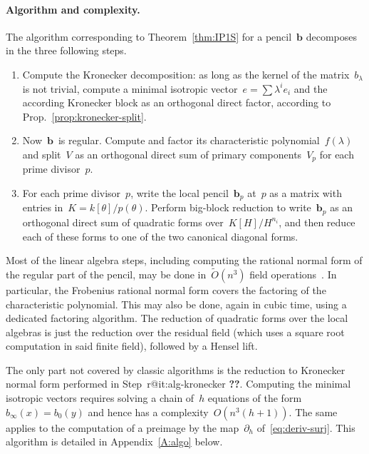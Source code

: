 \documentclass{article}%
\makeatletter
\newif\ifapx \apxtrue %
\def\labelenumi{(\roman{enumi})}
\def\itemref#1{\expandafter\ifx\csname r@#1\endcsname\relax
  {\bfseries ??}\else{\setcounter{enumi}{\ref{#1}}\labelenumi}\fi}
\def\Ot{\widetilde{O}}
\makeatother
\begin{document}
\paragraph{Algorithm and complexity.}

The algorithm corresponding to Theorem~\ref{thm:IP1S} for a
pencil~$\bm{b}$ decomposes in the three following steps.

\begin{enumerate}
\item \label{it:alg-kronecker} Compute the Kronecker decomposition: as
long as the kernel of the matrix~$b_{λ}$ is not trivial, compute a
minimal isotropic vector~$e = ∑ λ^i e_i$ and the according Kronecker
block as an orthogonal direct factor, according to
Prop.~\ref{prop:kronecker-split}.
\item \label{it:alg-factor} Now~$\bm{b}$~is regular. Compute and factor
its characteristic polynomial~$f(λ)$ and split~$V$ as an orthogonal direct
sum of primary components~$V_p$ for each prime divisor~$p$.
\item \label{it:alg-local} For each prime divisor~$p$, write the local
pencil~$\bm{b}_p$ at~$p$ as a matrix with entries in~$K = k[θ]/p(θ)$.
Perform big-block reduction to write~$\bm{b}_p$ as an orthogonal direct
sum of quadratic forms over~$K[H]/H^{n_i}$, and then reduce
each of these forms to one of the two canonical diagonal forms.
\end{enumerate}

Most of the linear algebra steps, including computing the
rational normal form of the regular part of the pencil, may be done
in~$\Ot(n^3)$ field operations~\cite{kaltoffen11compute}. In particular,
the Frobenius rational normal form covers the factoring of the
characteristic polynomial. This may also be done, again in cubic time,
using a dedicated factoring algorithm. The reduction of quadratic forms
over the local algebras is just the reduction over the residual field
(which uses a square root computation in said finite field), followed by
a Hensel lift.

The only part not covered by classic algorithms is the reduction to
Kronecker normal form performed in Step~\itemref{it:alg-kronecker}. Computing
the minimal isotropic vectors requires solving a chain of~$h$ equations
of the form~$b_{∞}(x) = b_0(y)$ and hence has a complexity~$O(n^3(h+1))$.
The same applies to the computation of a preimage by the map~$∂_h$
of~\eqref{eq:deriv-surj}. \ifapx This algorithm is detailed in
Appendix~\ref{A:algo} below. \fi
\end{document}
